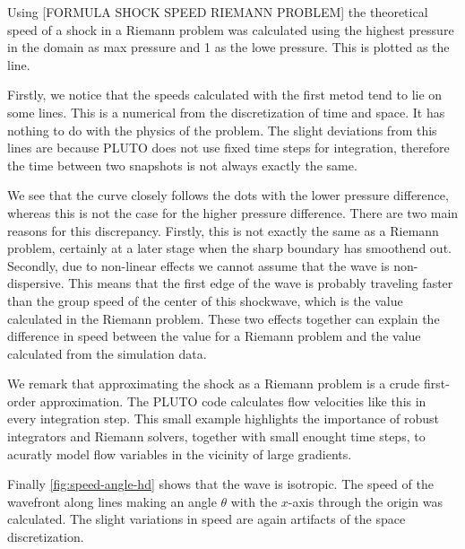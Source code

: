 Using [FORMULA SHOCK SPEED RIEMANN PROBLEM]
the theoretical speed of a shock in a Riemann problem was calculated using the highest pressure in the domain as max pressure and 1 as the lowe pressure. This is plotted as the line.

Firstly, we notice that the speeds calculated with the first metod tend to lie on some lines. This is a numerical from the discretization of time and space. 
It has nothing to do with the physics of the problem. 
The slight deviations from this lines are because PLUTO does not use fixed time steps for integration, therefore the time between two snapshots is not always exactly the same.

We see that the curve closely follows the dots with the lower pressure difference, whereas this is not the case for the higher pressure difference.
There are two main reasons for this discrepancy. 
Firstly, this is not exactly the same as a Riemann problem, certainly at a later stage when the sharp boundary has smoothend out.
Secondly, due to non-linear effects we cannot assume that the wave is non-dispersive. 
This means that the first edge of the wave is probably traveling faster than the group speed of the center of this shockwave, which is the value calculated in the Riemann problem.
These two effects together can explain the difference in speed between the value for a Riemann problem and the value calculated from the simulation data.

We remark that approximating the shock as a Riemann problem is a crude first-order approximation. 
The PLUTO code calculates flow velocities like this in every integration step. 
This small example highlights the importance of robust integrators and Riemann solvers, together with small enought time steps, to acuratly model flow variables in the vicinity of large gradients.

Finally \autoref{fig:speed-angle-hd} shows that the wave is isotropic. 
The speed of the wavefront along lines making an angle $\theta$ with the $x$-axis through the origin was calculated.
The slight variations in speed are again artifacts of the space discretization.

